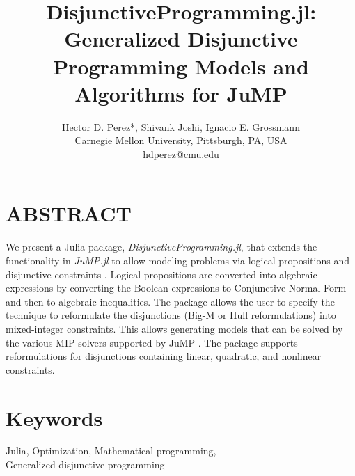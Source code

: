 \documentclass{juliacon}
\begin{document}
\title{DisjunctiveProgramming.jl: Generalized Disjunctive Programming Models and Algorithms for JuMP}
\author{
  \large Hector D. Perez*, Shivank Joshi, Ignacio E. Grossmann
  \\\normalsize Carnegie Mellon University, Pittsburgh, PA, USA  
  \\\normalsize	*hdperez@cmu.edu
}

\maketitle


\section*{ABSTRACT}
We present a Julia package, \textit{DisjunctiveProgramming.jl}, that extends the functionality in \textit{JuMP.jl} to allow modeling problems via logical propositions and disjunctive constraints \cite{dunning_huchette_lubin_2017}. Logical propositions are converted into algebraic expressions by converting the Boolean expressions to Conjunctive Normal Form and then to algebraic inequalities. The package allows the user to specify the technique to reformulate the disjunctions (Big-M or Hull reformulations) into mixed-integer constraints. This allows generating models that can be solved by the various MIP solvers supported by JuMP \cite{DunningHuchetteLubin2017}. The package supports reformulations for disjunctions containing linear, quadratic, and nonlinear constraints.

\section*{Keywords}
Julia, Optimization, Mathematical programming, \\ Generalized disjunctive programming
\end{document}
